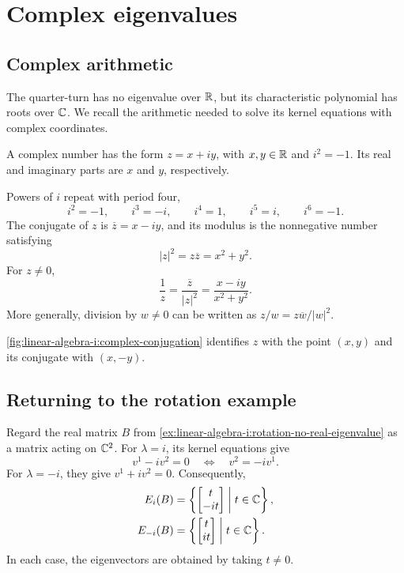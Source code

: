 \section{Complex eigenvalues}
\label{sec:linear-algebra-i:complex-eigenvalues}

\subsection{Complex arithmetic}

The quarter-turn has no eigenvalue over \(\mathbb{R}\), but its characteristic
polynomial has roots over \(\mathbb{C}\). We recall the arithmetic needed to
solve its kernel equations with complex coordinates.

A complex number has the form \(z=x+iy\), with \(x,y\in\mathbb{R}\) and
\(i^2=-1\). Its real and imaginary parts are \(x\) and \(y\), respectively.
\begin{marginfigure}
  \centering
  
  \caption[Conjugation in the complex plane]{A schematic for \(x,y>0\).
    Conjugation reflects a point across the real axis. The distance from
    zero is \(\lvert z\rvert=\sqrt{x^2+y^2}\) for both points.}
  \label{fig:linear-algebra-i:complex-conjugation}
\end{marginfigure}
Powers of \(i\) repeat with period four,
\[
  i^2=-1,\qquad i^3=-i,\qquad i^4=1,\qquad i^5=i,\qquad i^6=-1.
\]
The conjugate of \(z\) is \(\overline z=x-iy\), and its modulus is
the nonnegative number satisfying
\[
  |z|^2=z\overline z=x^2+y^2.
\]
For \(z\ne0\),
\[
  \frac1z=\frac{\overline z}{|z|^2}=\frac{x-iy}{x^2+y^2}.
\]
More generally, division by \(w\ne0\) can be written as
\(z/w=z\overline w/|w|^2\).

\autoref{fig:linear-algebra-i:complex-conjugation} identifies \(z\)
with the point \((x,y)\) and its conjugate with \((x,-y)\).

\subsection{Returning to the rotation example}

Regard the real matrix \(B\) from
\autoref{ex:linear-algebra-i:rotation-no-real-eigenvalue} as a matrix
acting on \(\mathbb{C}^2\). For \(\lambda=i\), its kernel equations give
\[
  v^1-iv^2=0\quad\Longleftrightarrow\quad v^2=-iv^1.
\]
For \(\lambda=-i\), they give \(v^1+iv^2=0\). Consequently,
\[
  \begin{aligned}
    E_i(B)&=\left\{\begin{bmatrix}t\\-it\end{bmatrix}\;\middle|\;t\in\mathbb{C}\right\},\\
    E_{-i}(B)&=\left\{\begin{bmatrix}t\\it\end{bmatrix}\;\middle|\;t\in\mathbb{C}\right\}.
  \end{aligned}
\]
In each case, the eigenvectors are obtained by taking \(t\ne0\).

